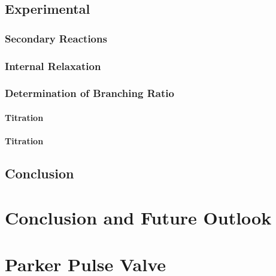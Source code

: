 \documentclass [PhD,nolistoftables,scheader] {uclathes}
\begin{document}
	\section{Experimental}
	
		\subsection{Secondary Reactions}
		
	
		\subsection{Internal Relaxation}
		
		
		
		\subsection{Determination of Branching Ratio}
		
		
			\subsubsection{ Titration}
			
	
			\subsubsection{ Titration}
			
			
	\section{Conclusion}
	

\chapter{Conclusion and Future Outlook}


\appendix

\chapter{Parker Pulse Valve}

\end{document}
